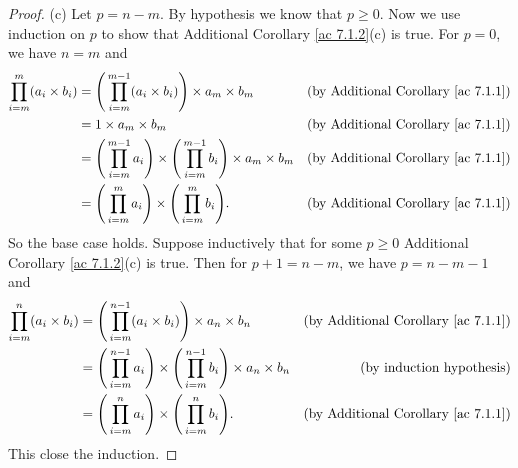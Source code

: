 \begin{proof}{(c)}
    Let \(p = n - m\).
    By hypothesis we know that \(p \geq 0\).
    Now we use induction on \(p\) to show that Additional Corollary \ref{ac 7.1.2}(c) is true.
    For \(p = 0\), we have \(n = m\) and
    \begin{align*}
        \prod_{i = m}^m (a_i \times b_i) & = \Bigg(\prod_{i = m}^{m - 1} (a_i \times b_i)\Bigg) \times a_m \times b_m                                 & \text{(by Additional Corollary \ref{ac 7.1.1})} \\
                                         & = 1 \times a_m \times b_m                                                                                  & \text{(by Additional Corollary \ref{ac 7.1.1})} \\
                                         & = \Bigg(\prod_{i = m}^{m - 1} a_i\Bigg) \times \Bigg(\prod_{i = m}^{m - 1} b_i\Bigg) \times a_m \times b_m & \text{(by Additional Corollary \ref{ac 7.1.1})} \\
                                         & = \Bigg(\prod_{i = m}^m a_i\Bigg) \times \Bigg(\prod_{i = m}^m b_i\Bigg).                                  & \text{(by Additional Corollary \ref{ac 7.1.1})}
    \end{align*}
    So the base case holds.
    Suppose inductively that for some \(p \geq 0\) Additional Corollary \ref{ac 7.1.2}(c) is true.
    Then for \(p + 1 = n - m\), we have \(p = n - m - 1\) and
    \begin{align*}
        \prod_{i = m}^n (a_i \times b_i) & = \Bigg(\prod_{i = m}^{n - 1} (a_i \times b_i)\Bigg) \times a_n \times b_n                                 & \text{(by Additional Corollary \ref{ac 7.1.1})} \\
                                         & = \Bigg(\prod_{i = m}^{n - 1} a_i\Bigg) \times \Bigg(\prod_{i = m}^{n - 1} b_i\Bigg) \times a_n \times b_n & \text{(by induction hypothesis)}                \\
                                         & = \Bigg(\prod_{i = m}^n a_i\Bigg) \times \Bigg(\prod_{i = m}^n b_i\Bigg).                                  & \text{(by Additional Corollary \ref{ac 7.1.1})}
    \end{align*}
    This close the induction.
\end{proof}

